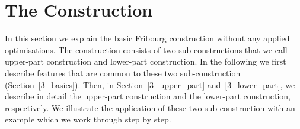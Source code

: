


\section{The Construction}
\label{3_contruction}
In this section we explain the basic Fribourg construction without any applied optimisations. The construction consists of two sub-constructions that we call upper-part construction and lower-part construction. In the following  we first describe features that are common to these two sub-construction (Section~\ref{3_basics}). Then, in Section~\ref{3_upper_part} and~\ref{3_lower_part}, we describe in detail the upper-part construction and the lower-part construction, respectively. We illustrate the application of these two sub-construction with an example which we work through step by step.

